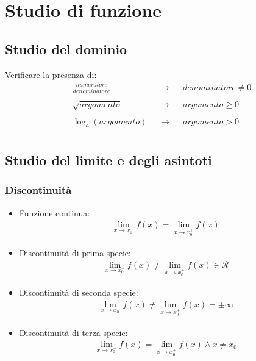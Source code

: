 \documentclass[a4paper]{article}
\begin{document}
	
	
	\newpage
	\section{Studio di funzione}
		\subsection{Studio del dominio}
		Verificare la presenza di:\\
		\begin{align*}
			&\frac{numeratore}{denominatore} & &\to & &denominatore \ne 0\\\\
			&\sqrt{argomento}				 & &\to & &argomento \ge 0\\\\
			&\log_{a}{(argomento)}			 & &\to & &argomento > 0\\
		\end{align*}
		
		\subsection{Studio del limite e degli asintoti}
		\subsubsection*{Discontinuità}
		\begin{itemize}
			\item  Funzione continua:
			\begin{align*}
			\lim\limits_{x \to x_0^-} f(x) = \lim\limits_{x \to x_0^+} f(x)
			\end{align*}
			\item  Discontinuità di prima specie:
			\begin{align*}
			\lim\limits_{x \to x_0^-} f(x) \ne \lim\limits_{x \to x_0^+} f(x) \in \mathcal{R}
			\end{align*}
			\item  Discontinuità di seconda specie:
			\begin{align*}
			\lim\limits_{x \to x_0^-} f(x) \ne \lim\limits_{x \to x_0^+} f(x) = \pm \infty
			\end{align*}
			\item Discontinuità di terza specie:
			\begin{align*}
			\lim\limits_{x \to x_0^-} f(x) = \lim\limits_{x \to x_0^+} f(x) \wedge x \ne x_0
			\end{align*}
			
		\end{itemize}
		
\end{document}
